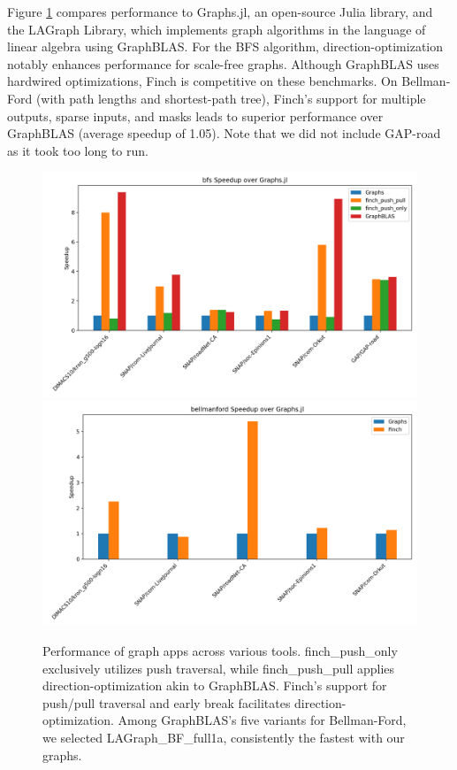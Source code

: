 Figure \ref{fig:graph_result} compares performance to Graphs.jl, an open-source Julia library, and the LAGraph Library, which implements graph algorithms in the language of linear algebra using GraphBLAS\cite{mattson2019lagraph}. For the BFS algorithm, direction-optimization notably enhances performance for scale-free graphs. Although GraphBLAS uses hardwired optimizations, Finch is competitive on these benchmarks. On Bellman-Ford (with path lengths and shortest-path tree), Finch's support for multiple outputs, sparse inputs, and masks leads to superior performance over GraphBLAS (average speedup of 1.05). Note that we did not include GAP-road as it took too long to run.
 
\begin{figure}
	\includegraphics[width=0.5\linewidth]{bfs_speedup_over_graphs.jl.png}%
	\includegraphics[width=0.5\linewidth]{bellmanford_speedup_over_graphs.jl.png}
    \vspace{-12pt}
    \caption{Performance of graph apps across various tools. finch\_push\_only exclusively utilizes push traversal, while finch\_push\_pull applies direction-optimization akin to GraphBLAS. Finch's support for push/pull traversal and early break facilitates direction-optimization. Among GraphBLAS's five variants for Bellman-Ford, we selected LAGraph\_BF\_full1a, consistently the fastest with our graphs.}
     \label{fig:graph_result}
\end{figure}

